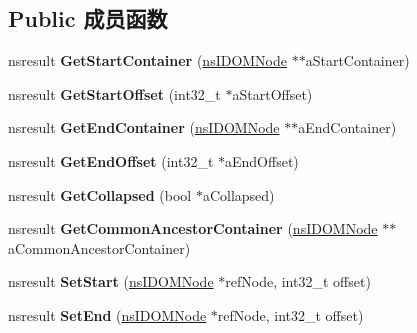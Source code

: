 \subsection*{Public 成员函数}
\begin{DoxyCompactItemize}
\item 
\mbox{\label{interfacens_i_d_o_m_range_ad12175ff3ff3261d174ded324f318438}} 
nsresult {\bfseries Get\+Start\+Container} (\hyperlink{interfacens_i_d_o_m_node}{ns\+I\+D\+O\+M\+Node} $\ast$$\ast$a\+Start\+Container)
\item 
\mbox{\label{interfacens_i_d_o_m_range_ae7a98f2f615ccf0010e277617824cf2b}} 
nsresult {\bfseries Get\+Start\+Offset} (int32\+\_\+t $\ast$a\+Start\+Offset)
\item 
\mbox{\label{interfacens_i_d_o_m_range_adb9c5af4f76ae1b9abeed537e12cd8c3}} 
nsresult {\bfseries Get\+End\+Container} (\hyperlink{interfacens_i_d_o_m_node}{ns\+I\+D\+O\+M\+Node} $\ast$$\ast$a\+End\+Container)
\item 
\mbox{\label{interfacens_i_d_o_m_range_a6681c27838e2fbd4ad9e2aff4cb5455d}} 
nsresult {\bfseries Get\+End\+Offset} (int32\+\_\+t $\ast$a\+End\+Offset)
\item 
\mbox{\label{interfacens_i_d_o_m_range_a04d1e36b4883ea9b3877e0a48b422312}} 
nsresult {\bfseries Get\+Collapsed} (bool $\ast$a\+Collapsed)
\item 
\mbox{\label{interfacens_i_d_o_m_range_a77c03548cdd3198ff920f07713b3ee57}} 
nsresult {\bfseries Get\+Common\+Ancestor\+Container} (\hyperlink{interfacens_i_d_o_m_node}{ns\+I\+D\+O\+M\+Node} $\ast$$\ast$a\+Common\+Ancestor\+Container)
\item 
\mbox{\label{interfacens_i_d_o_m_range_a3173b6d92861622886d39fae25825304}} 
nsresult {\bfseries Set\+Start} (\hyperlink{interfacens_i_d_o_m_node}{ns\+I\+D\+O\+M\+Node} $\ast$ref\+Node, int32\+\_\+t offset)
\item 
\mbox{\label{interfacens_i_d_o_m_range_a739a4ae256ad587224d7f6f0bd55615c}} 
nsresult {\bfseries Set\+End} (\hyperlink{interfacens_i_d_o_m_node}{ns\+I\+D\+O\+M\+Node} $\ast$ref\+Node, int32\+\_\+t offset)
$$
\end{DoxyCompactItemize}
